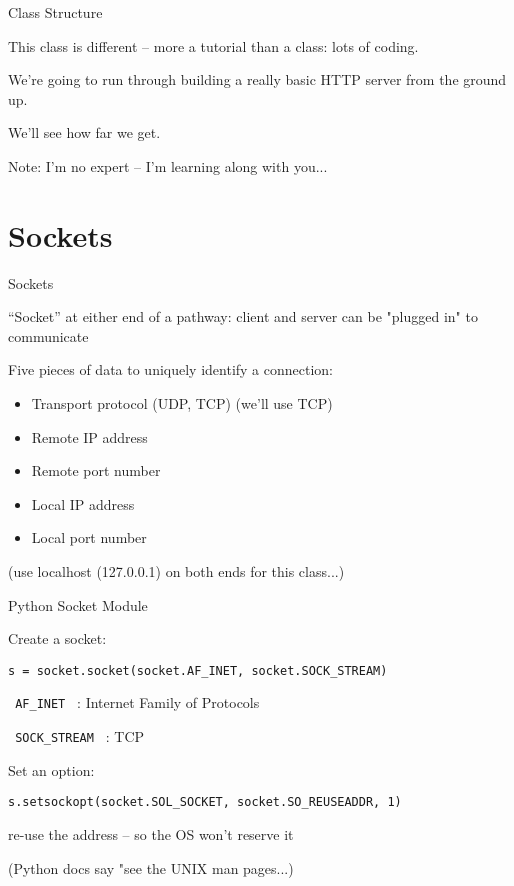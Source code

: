 \documentclass{beamer}
\begin{document}
\begin{frame}{Class Structure}

{\Large
This class is different -- more a tutorial than a class: lots of coding.

\vfill
We're going to run through building a really basic HTTP server from the ground up.

\vfill
We'll see how far we get.
}

\vfill
Note: I'm no expert -- I'm learning along with you...
\end{frame}

\section{Sockets}

\begin{frame}[fragile]{Sockets}

{\Large ``Socket'' at either end of a pathway: client and server can be
"plugged in" to communicate}

\vfill
{\Large Five pieces of data to uniquely identify a connection:}

\begin{itemize}
  \item Transport protocol (UDP, TCP) (we'll use TCP)
  \item Remote IP address
  \item Remote port number
  \item Local IP address
  \item Local port number 
\end{itemize}

\vfill
(use localhost (127.0.0.1) on both ends for this class...)
\end{frame} 

\begin{frame}[fragile]{Python Socket Module}

{\Large Create a socket:}
\begin{verbatim}
s = socket.socket(socket.AF_INET, socket.SOCK_STREAM)
\end{verbatim}
\verb| AF_INET | : Internet Family of Protocols

\verb| SOCK_STREAM | : TCP

\vfill
{\Large Set an option:}
\begin{verbatim}
s.setsockopt(socket.SOL_SOCKET, socket.SO_REUSEADDR, 1)  
\end{verbatim}
 re-use the address -- so the OS won't reserve it

\vfill
(Python docs say "see the UNIX man pages...)
\end{frame}
\end{document}
